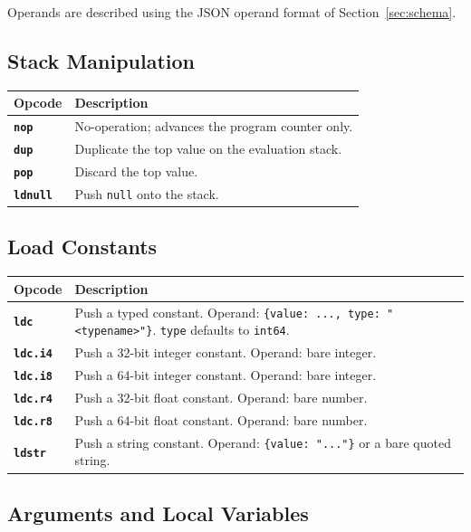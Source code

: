 \documentclass[11pt,a4paper]{article}
\newcommand{\code}[1]{\texttt{\small #1}}
\newcommand{\opcode}[1]{\textbf{\texttt{#1}}}
\begin{document}
Operands are described using the JSON operand format of
Section~\ref{sec:schema}.

\subsection{Stack Manipulation}

\begin{longtable}{lp{10.5cm}}
  \toprule
  \textbf{Opcode} & \textbf{Description} \\
  \midrule
  \endhead
  \opcode{nop}    & No-operation; advances the program counter only. \\
  \opcode{dup}    & Duplicate the top value on the evaluation stack. \\
  \opcode{pop}    & Discard the top value. \\
  \opcode{ldnull} & Push \texttt{null} onto the stack. \\
  \bottomrule
\end{longtable}

\subsection{Load Constants}

\begin{longtable}{lp{10.5cm}}
  \toprule
  \textbf{Opcode} & \textbf{Description} \\
  \midrule
  \endhead
  \opcode{ldc}    &
    Push a typed constant.
    Operand: \code{\{value: ..., type: "<typename>"\}}.
    \texttt{type} defaults to \texttt{int64}. \\
  \opcode{ldc.i4} & Push a 32-bit integer constant. Operand: bare integer. \\
  \opcode{ldc.i8} & Push a 64-bit integer constant. Operand: bare integer. \\
  \opcode{ldc.r4} & Push a 32-bit float constant. Operand: bare number. \\
  \opcode{ldc.r8} & Push a 64-bit float constant. Operand: bare number. \\
  \opcode{ldstr}  &
    Push a string constant.
    Operand: \code{\{value: "..."\}} or a bare quoted string. \\
  \bottomrule
\end{longtable}

\subsection{Arguments and Local Variables}
\end{document}
